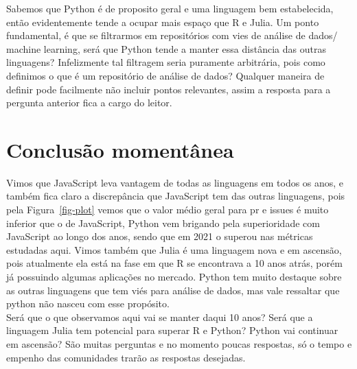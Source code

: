 \documentclass[
  letterpaper,
  DIV=11,
  numbers=noendperiod]{scrartcl}
\begin{document}
Sabemos que Python é de proposito geral e uma linguagem bem
estabelecida, então evidentemente tende a ocupar mais espaço que R e
Julia. Um ponto fundamental, é que se filtrarmos em repositórios com
vies de análise de dados/ machine learning, será que Python tende a
manter essa distância das outras linguagens? Infelizmente tal filtragem
seria puramente arbitrária, pois como definimos o que é um repositório
de análise de dados? Qualquer maneira de definir pode facilmente não
incluir pontos relevantes, assim a resposta para a pergunta anterior
fica a cargo do leitor.

\section{Conclusão momentânea}

Vimos que JavaScript leva vantagem de todas as linguagens em todos os
anos, e também fica claro a discrepância que JavaScript tem das outras
linguagens, pois pela Figura~\ref{fig-plot} vemos que o valor médio
geral para pr e issues é muito inferior que o de JavaScript, Python vem
brigando pela superioridade com JavaScript ao longo dos anos, sendo que
em 2021 o superou nas métricas estudadas aqui. Vimos também que Julia é
uma linguagem nova e em ascensão, pois atualmente ela está na fase em
que R se encontrava a 10 anos atrás, porém já possuindo algumas
aplicações no mercado. Python tem muito destaque sobre as outras
linguagens que tem viés para análise de dados, mas vale ressaltar que
python não nasceu com esse propósito.\\
Será que o que observamos aqui vai se manter daqui 10 anos? Será que a
linguagem Julia tem potencial para superar R e Python? Python vai
continuar em ascensão? São muitas perguntas e no momento poucas
respostas, só o tempo e empenho das comunidades trarão as respostas
desejadas.
\end{document}
